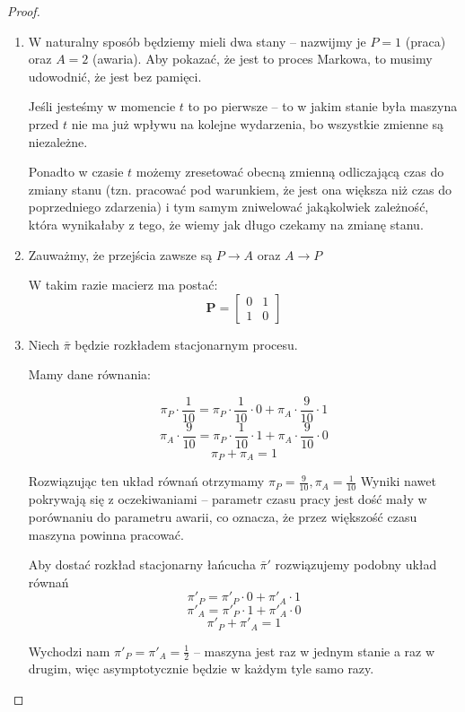 \begin{proof} \( \) %
    \begin{enumerate}
        \item W naturalny sposób będziemy mieli dwa stany -- nazwijmy je \( P = 1 \) (praca) oraz \( A = 2 \) (awaria).
            Aby pokazać, że jest to proces Markowa, to musimy udowodnić, że jest bez pamięci.
            
            Jeśli jesteśmy w momencie \( t \) to po pierwsze -- to w jakim stanie była maszyna przed \( t \)
            nie ma już wpływu na kolejne wydarzenia, bo wszystkie zmienne są niezależne.
            
            Ponadto w czasie \( t \) możemy zresetować obecną zmienną odliczającą czas do zmiany stanu
            (tzn. pracować pod warunkiem, że jest ona większa niż czas do poprzedniego zdarzenia) 
            i tym samym zniwelować jakąkolwiek zależność, która wynikałaby z tego, że wiemy jak długo czekamy na zmianę stanu.
            
        \item Zauważmy, że przejścia zawsze są \( P \rightarrow A \) oraz \( A \rightarrow P \)
        
        W takim razie macierz ma postać:
        \[
        \mathbf{P} = \begin{bmatrix}
            0 & 1 \\
            1 & 0
        \end{bmatrix}
        \]
        
        \item Niech \( \bar \pi \) będzie rozkładem stacjonarnym procesu.
        
        Mamy dane równania:
        
       \[
            \pi_P \cdot \frac{1}{10} = \pi_P \cdot \frac{1}{10} \cdot 0 + \pi_A \cdot \frac{9}{10} \cdot 1
        \]
        \[
            \pi_A \cdot \frac{9}{10} = \pi_P \cdot \frac{1}{10} \cdot 1 + \pi_A \cdot \frac{9}{10} \cdot 0
        \]
        \[  
            \pi_P + \pi_A = 1
        \]
        
        Rozwiązując ten układ równań otrzymamy \( \pi_P = \frac{9}{10}, \pi_A = \frac{1}{10} \)
        Wyniki nawet pokrywają się z oczekiwaniami -- parametr czasu pracy jest dość mały w porównaniu do parametru awarii,
        co oznacza, że przez większość czasu maszyna powinna pracować.
        
        Aby dostać rozkład stacjonarny łańcucha \( \bar \pi' \) rozwiązujemy podobny układ równań
        \[
            \pi'_P = \pi'_P \cdot 0 + \pi'_A \cdot 1
        \]
        \[
            \pi'_A = \pi'_P \cdot 1 + \pi'_A \cdot 0
        \]
        \[
            \pi'_P + \pi'_A = 1
        \]
        
        Wychodzi nam \( \pi'_P = \pi'_A = \frac{1}{2} \) -- maszyna jest raz w jednym stanie a raz w drugim, więc asymptotycznie będzie w każdym tyle samo razy.
        
    \end{enumerate}
\end{proof}